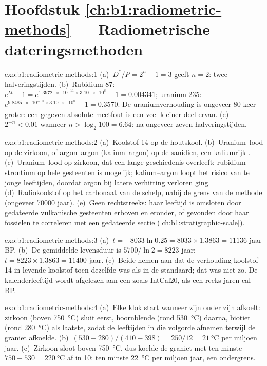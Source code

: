 \section*{Hoofdstuk \ref{ch:b1:radiometric-methods} --- Radiometrische dateringsmethoden}

\begin{solution}{exo:b1:radiometric-methods:1}
(a)~$D^*/P = 2^n - 1 = 3$ geeft $n = 2$: twee halveringstijden. (b)~Rubidium-87:
$e^{\lambda t} - 1 = e^{\num{1.3972e-11} \times \num{3.10e8}} - 1 = 0.004341$;
uranium-235: $e^{\num{9.8485e-10} \times \num{3.10e8}} - 1 = 0.3570$. De
uraniumverhouding is ongeveer 80 keer groter: een gegeven absolute meetfout is een veel
kleiner deel ervan. (c)~$2^{-n} < 0.01$ wanneer $n > \log_2 100 = 6.64$: na ongeveer
zeven halveringstijden.
\end{solution}

\begin{solution}{exo:b1:radiometric-methods:2}
(a)~Koolstof-14 op de houtskool. (b)~Uranium--lood op de zirkoon, of argon--argon
(kalium--argon) op de sanidien, een kaliumrijk . (c)~Uranium--lood op zirkoon,
dat een lange geschiedenis overleeft; rubidium--strontium op hele gesteenten is mogelijk;
kalium--argon loopt het risico van te jonge leeftijden, doordat argon bij latere verhitting verloren ging. (d)~Radiokoolstof op het carbonaat van de schelp, nabij de grens van de methode
(ongeveer \num{70000} jaar). (e)~Geen rechtstreeks: haar leeftijd is omsloten door gedateerde
vulkanische gesteenten erboven en eronder, of gevonden door haar fossielen te correleren met een gedateerde
sectie (\cref{ch:b1:stratigraphic-scale}).
\end{solution}

\begin{solution}{exo:b1:radiometric-methods:3}
(a)~$t = -8033 \ln 0.25 = 8033 \times 1.3863 = \num{11136}$ jaar BP.
(b)~De gemiddelde levensduur is $5700/\ln 2 = \num{8223}$ jaar: $t = 8223 \times 1.3863 =
\num{11400}$ jaar. (c)~Beide nemen aan dat de verhouding koolstof-14 in levende koolstof toen dezelfde was als in de standaard; dat was niet zo. De kalenderleeftijd wordt afgelezen aan een  zoals IntCal20, als een reeks jaren cal BP.
\end{solution}

\begin{solution}{exo:b1:radiometric-methods:4}
(a)~Elke klok start wanneer zijn  onder zijn  afkoelt:
zirkoon (boven \qty{750}{\celsius}) sluit eerst, hoornblende (rond
\qty{530}{\celsius}) daarna, biotiet (rond \qty{280}{\celsius}) als laatste, zodat de leeftijden
in die volgorde afnemen terwijl de graniet afkoelde. (b)~$(530 - 280)/(410 - 398) =
250/12 = \qty{21}{\celsius}$ per miljoen jaar. (c)~Zirkoon sloot boven
\qty{750}{\celsius}, dus koelde de graniet met ten minste $750 - 530 =
\qty{220}{\celsius}$ af in \qty{10}{\Myr}: ten minste \qty{22}{\celsius} per miljoen
jaar, een ondergrens.
\end{solution}

